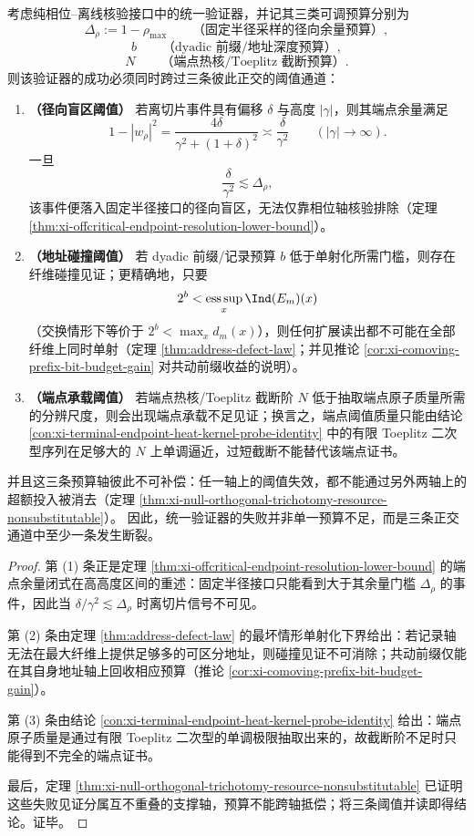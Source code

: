 \begin{theorem}[统一验证器的三端预算与正交不可补偿性]\label{thm:xi-unified-verifier-three-budget-orthogonality}
考虑纯相位--离线核验接口中的统一验证器，并记其三类可调预算分别为
\[
\Delta_\rho:=1-\rho_{\max}
\qquad\text{（固定半径采样的径向余量预算）},
\]
\[
b
\qquad\text{（dyadic 前缀/地址深度预算）},
\]
\[
N
\qquad\text{（端点热核/Toeplitz 截断预算）}.
\]
则该验证器的成功必须同时跨过三条彼此正交的阈值通道：
\begin{enumerate}
  \item \textbf{（径向盲区阈值）}
  若离切片事件具有偏移 \(\delta\) 与高度 \(|\gamma|\)，则其端点余量满足
  \[
  1-|w_\rho|^2
  =
  \frac{4\delta}{\gamma^2+(1+\delta)^2}
  \asymp
  \frac{\delta}{\gamma^2}
  \qquad(|\gamma|\to\infty).
  \]
  一旦
  \[
  \frac{\delta}{\gamma^2}\lesssim \Delta_\rho,
  \]
  该事件便落入固定半径接口的径向盲区，无法仅靠相位轴核验排除（定理 \ref{thm:xi-offcritical-endpoint-resolution-lower-bound}）。

  \item \textbf{（地址碰撞阈值）}
  若 dyadic 前缀/记录预算 \(b\) 低于单射化所需门槛，则存在纤维碰撞见证；更精确地，只要
  \[
  2^b<\operatorname*{ess\,sup}_{x}\Ind(E_m)(x)
  \]
  （交换情形下等价于 \(2^b<\max_x d_m(x)\)），则任何扩展读出都不可能在全部纤维上同时单射（定理 \ref{thm:address-defect-law}；并见推论 \ref{cor:xi-comoving-prefix-bit-budget-gain} 对共动前缀收益的说明）。

  \item \textbf{（端点承载阈值）}
  若端点热核/Toeplitz 截断阶 \(N\) 低于抽取端点原子质量所需的分辨尺度，则会出现端点承载不足见证；换言之，端点阈值质量只能由结论 \ref{con:xi-terminal-endpoint-heat-kernel-probe-identity} 中的有限 Toeplitz 二次型序列在足够大的 \(N\) 上单调逼近，过短截断不能替代该端点证书。
\end{enumerate}
并且这三条预算轴彼此不可补偿：任一轴上的阈值失效，都不能通过另外两轴上的超额投入被消去（定理 \ref{thm:xi-null-orthogonal-trichotomy-resource-nonsubstitutable}）。
因此，统一验证器的失败并非单一预算不足，而是三条正交通道中至少一条发生断裂。
\end{theorem}
\begin{proof}
第 (1) 条正是定理 \ref{thm:xi-offcritical-endpoint-resolution-lower-bound} 的端点余量闭式在高高度区间的重述：固定半径接口只能看到大于其余量门槛 \(\Delta_\rho\) 的事件，因此当
\(
\delta/\gamma^2\lesssim \Delta_\rho
\)
时离切片信号不可见。

第 (2) 条由定理 \ref{thm:address-defect-law} 的最坏情形单射化下界给出：若记录轴无法在最大纤维上提供足够多的可区分地址，则碰撞见证不可消除；共动前缀仅能在其自身地址轴上回收相应预算（推论 \ref{cor:xi-comoving-prefix-bit-budget-gain}）。

第 (3) 条由结论 \ref{con:xi-terminal-endpoint-heat-kernel-probe-identity} 给出：端点原子质量是通过有限 Toeplitz 二次型的单调极限抽取出来的，故截断阶不足时只能得到不完全的端点证书。

最后，定理 \ref{thm:xi-null-orthogonal-trichotomy-resource-nonsubstitutable} 已证明这些失败见证分属互不重叠的支撑轴，预算不能跨轴抵偿；将三条阈值并读即得结论。证毕。
\end{proof}

